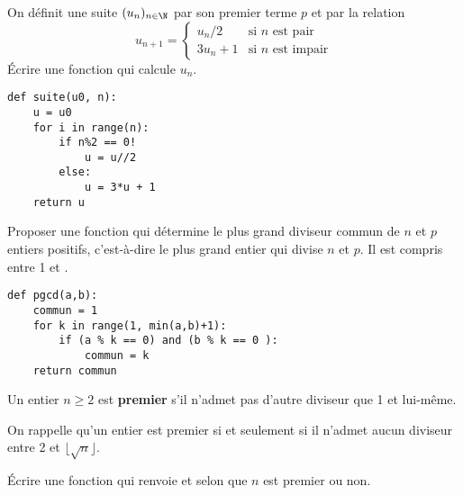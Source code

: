 \begin{Exercise}[title= Suite $3n+1$ ]
On définit une suite $(u_n)_{n\in \N}$ par son premier terme $p$ et par la relation
\[u_{n+1} = \left\{\begin{matrix} u_n/2&\text{si $n$ est pair}\\
3u_n+1&\text{si $n$ est impair}\end{matrix}\right.\]
Écrire une fonction  qui calcule $u_n$.
\end{Exercise}
\begin{Answer}
\begin{lstlisting}
def suite(u0, n):
    u = u0
    for i in range(n):
        if n%2 == 0!
            u = u//2
        else:
            u = 3*u + 1
    return u
\end{lstlisting}
\end{Answer}
\begin{Exercise}[title= PGCD]
Proposer une fonction  qui détermine le plus grand diviseur commun de $n$ et $p$ entiers positifs, c'est-à-dire le plus grand entier qui divise $n$ et $p$. Il est compris entre 1 et .
\end{Exercise}
\begin{Answer}
\begin{lstlisting}
def pgcd(a,b):
    commun = 1
    for k in range(1, min(a,b)+1):
        if (a % k == 0) and (b % k == 0 ):
            commun = k
    return commun
\end{lstlisting}
\end{Answer}
\begin{Exercise}[title= Nombres premiers]

Un entier $n\ge 2$ est {\bf premier} s'il n'admet pas d'autre diviseur que 1 et lui-même.

On rappelle qu'un entier est premier si et seulement si il n'admet aucun diviseur entre 2 et $\lfloor\sqrt n\rfloor$.

Écrire une fonction  qui renvoie  et  selon que $n$ est premier ou non.
\end{Exercise}
